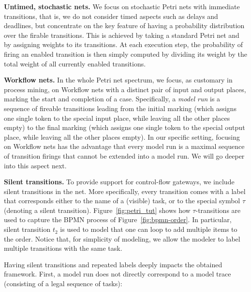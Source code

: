 \smallskip
\noindent
\textbf{Untimed, stochastic nets.}
We focus on stochastic Petri nets with immediate transitions, that is, we do not consider timed aspects such as delays and deadlines, but concentrate on the key feature of having a probability distribution over the firable transitions. This is achieved by taking a standard Petri net and by assigning weights to its transitions. At each execution step, the probability of firing an enabled transition is then simply computed by dividing its weight by the total weight of all currently enabled transitions.


\noindent
\textbf{Workflow nets.} In the whole Petri net spectrum, we focus, as customary in process mining, on Workflow nets with a distinct pair of input and output places, marking the start and completion of a case. Specifically, a \emph{model run} is a sequence of fireable transitions leading from the initial marking (which assigns one single token to the special input place, while leaving all the other places empty) to the final marking (which assigns one single token to the special output place, while leaving all the other places empty). In our specific setting, focusing on Workflow nets has the advantage that every model run is a maximal sequence of transition firings that cannot be extended into a model run. We will go deeper into this aspect next.


\noindent
\textbf{Silent transitions.} To provide support for control-flow gateways, we include silent transitions in the net. More specifically, every transition comes with a label that corresponds either to the name of a (visible) task, or to the special symbol $\tau$ (denoting a silent transition). Figure~\ref{fig:petri_tut} shows how $\tau$-transitions are used to capture the BPMN process of Figure~\ref{fig:bpmn-order}. In particular, silent transition $t_2$ is used to model that one can loop to add multiple items to the order. Notice that, for simplicity of modeling, we allow the modeler to label multiple transitions with the same task.

Having silent transitions and repeated labels deeply impacts the obtained framework. First, a model run does not directly correspond to a model trace (consisting of a legal sequence of tasks):


